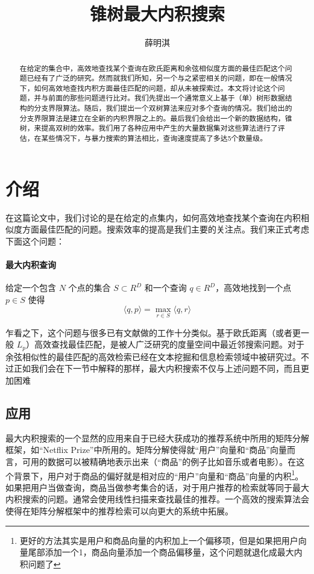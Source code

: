 \documentclass[twocolumn]{article}
\begin{document}
\title{锥树最大内积搜索}
\author{薛明淇}
\maketitle

\begin{abstract}
在给定的集合中，高效地查找某个查询在欧氏距离和余弦相似度方面的最佳匹配这个问题已经有了广泛的研究。然而就我们所知，另一个与之紧密相关的问题，即在一般情况下，如何高效地查找内积方面最佳匹配的问题，却从未被探索过。本文将讨论这个问题，并与前面的那些问题进行比对。我们先提出一个通常意义上基于（单）树形数据结构的分支界限算法。随后，我们提出一个双树算法来应对多个查询的情况。我们给出的分支界限算法是建立在全新的内积界限之上的。最后我们会给出一个新的数据结构，锥树，来提高双树的效率。我们用了各种应用中产生的大量数据集对这些算法进行了评估，在某些情况下，与暴力搜索的算法相比，查询速度提高了多达5个数量级。
\end{abstract}


\section{介绍}

在这篇论文中，我们讨论的是在给定的点集内，如何高效地查找某个查询在内积相似度方面最佳匹配的问题。搜索效率的提高是我们主要的关注点。我们来正式考虑下面这个问题：

\paragraph{最大内积查询} 给定一个包含 $N$ 个点的集合 $S \subset R^D$ 和一个查询 $q \in R^D$，高效地找到一个点 $p \in S$ 使得
\begin{equation}
\langle q,p \rangle = \max_{r \in S}\langle q,r \rangle
\end{equation}

乍看之下，这个问题与很多已有文献做的工作十分类似。基于欧氏距离（或者更一般 $L_p$）高效查找最佳匹配，是被人广泛研究的度量空间中最近邻搜索问题。对于余弦相似性的最佳匹配的高效检索已经在文本挖掘和信息检索领域中被研究过。不过正如我们会在下一节中解释的那样，最大内积搜索不仅与上述问题不同，而且更加困难

\subsection{应用}
最大内积搜索的一个显然的应用来自于已经大获成功的推荐系统中所用的矩阵分解框架，如“Netflix Prize”中所用的。矩阵分解使得就“用户”向量和“商品”向量而言，可用的数据可以被精确地表示出来（“商品”的例子比如音乐或者电影）。在这个背景下，用户对于商品的偏好就是相对应的“用户”向量和“商品”向量的内积\footnote{更好的方法其实是用户和商品向量的内积加上一个偏移项，但是如果把用户向量尾部添加一个1，商品向量添加一个商品偏移量，这个问题就退化成最大内积问题了}。如果把用户当做查询，商品当做参考集合的话，对于用户推荐的检索就等同于最大内积搜索的问题。通常会使用线性扫描来查找最佳的推荐。一个高效的搜索算法会使得在矩阵分解框架中的推荐检索可以向更大的系统中拓展。
\end{document}
